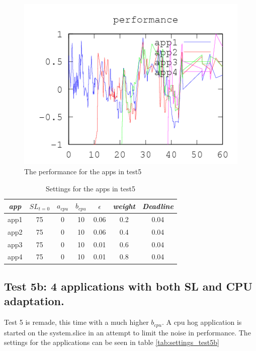 \documentclass[nobiblatex]{LTHthesis}
\begin{document}
\begin{figure}[!H]
  \centering
  \includegraphics{"tools/plot/logs/test5/f"}
  \caption{The performance for the apps in test5}
  \label{fig:test5_f}
\end{figure}



\begin{table}
  \centering
  \begin{tabular}{|c|c|c|c|c|c|c|}
 	\hline 
   \emph{app} & $SL_{t=0}$ & \textbf{$a_{cpu}$} & \textbf{$b_{cpu}$} & \textbf{$\epsilon$} & \emph{weight} & \emph{Deadline} \\ \hline
	app1 & 75 & 0 & 10 & 0.06 & 0.2 &0.04  \\ \hline
	app2 & 75 & 0 & 10 & 0.06 & 0.4 &0.04  \\ \hline
	app3 & 75 & 0 & 10 & 0.01 & 0.6 &0.04  \\ \hline
	app4 & 75 & 0 & 10 & 0.01 & 0.8 &0.04  \\ \hline        
  \end{tabular}
  \caption{Settings for the apps in test5}
  \label{tab:settings_test5}
\end{table}


\subsection{Test 5b: 4 applications with both SL and CPU adaptation.}
Test 5 is remade, this time with a much higher $b_{cpu}$.
A cpu hog application is started on the system.slice in an attempt to limit the noise in performance.
 The settings for the applications can be seen in table  \ref{tab:settings_test5b}
\end{document}
